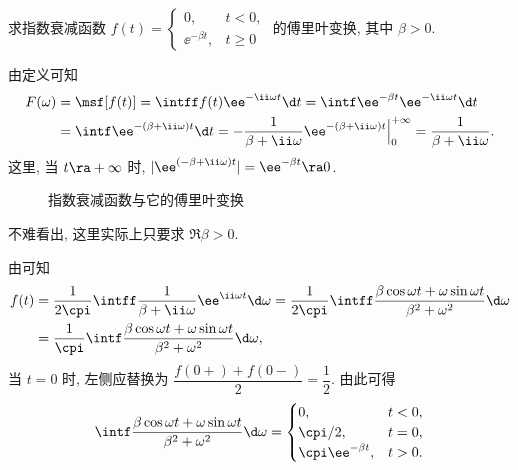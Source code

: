 \begin{example}\label{exam:fourier-transform-exponential-decay}
  求指数衰减函数 $f(t)=\begin{cases}
    0,&t<0,\\
    \ee^{-\beta t},&t\ge 0
  \end{cases}$ 的傅里叶变换, 其中 $\beta>0$.
\end{example}

\begin{solution}
  由定义可知
  \begin{align*}
    F(\omega)&=\msf[f(t)]=\intff f(t)\ee^{-\ii \omega t}\d t
    =\intf\ee^{-\beta t}\ee^{-\ii \omega t}\d t\\
    &=\intf\ee^{-(\beta+\ii \omega)t}\d t
    =-\frac1{\beta+\ii \omega}\ee^{-(\beta+\ii \omega)t}\Big|_0^{+\infty}
    =\frac1{\beta+\ii \omega}.
  \end{align*}
  这里, 当 $t\ra +\infty$ 时, $|\ee^{(-\beta+\ii \omega)t}|=\ee^{-\beta t}\ra 0$.
\end{solution}

\begin{figure}[!htb]
  \centering
  \caption{指数衰减函数与它的傅里叶变换}
\end{figure}

不难看出, 这里实际上只要求 $\Re\beta>0$.

由\thmFI 可知
\begin{align*}
    f(t)
  &=\frac1{2\cpi}\intff \frac1{\beta+\ii \omega}\ee^{\ii \omega t}\d \omega
   =\frac1{2\cpi}\intff \frac{\beta\cos\omega t+\omega\sin\omega t}{\beta^2+\omega^2}\d \omega\\
  &=\frac1{\cpi}\intf \frac{\beta\cos\omega t+\omega\sin\omega t}{\beta^2+\omega^2}\d \omega,
\end{align*}
当 $t=0$ 时, 左侧应替换为 $\dfrac{f(0+)+f(0-)}2=\dfrac12$.
由此可得
\[
  \intf\frac{\beta\cos\omega t+\omega\sin\omega t}{\beta^2+\omega^2}\d\omega
  =\begin{cases}
    0,&t<0,\\
    \cpi/2,&t=0,\\
    \cpi \ee^{-\beta t},&t>0.
  \end{cases}
\]

